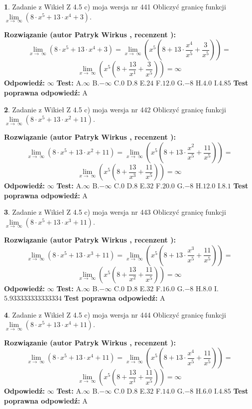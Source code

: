 \documentclass[12pt, a4paper]{article}
\theoremstyle{definition} %
\newtheorem{zad}{}
\newcommand{\zadStart}[1]{\begin{zad}#1\newline}
\newcommand{\zadStop}{\end{zad}}
\newcommand{\rozwStart}[2]{\noindent \textbf{Rozwiązanie (autor #1 , recenzent #2): }\newline}
\newcommand{\rozwStop}{\newline}
\newcommand{\odpStart}{\noindent \textbf{Odpowiedź:}\newline}
\newcommand{\odpStop}{\newline}
\newcommand{\testStart}{\noindent \textbf{Test:}\newline}
\newcommand{\testStop}{\newline}
\newcommand{\kluczStart}{\noindent \textbf{Test poprawna odpowiedź:}\newline}
\newcommand{\kluczStop}{\newline}
\begin{document}
\zadStart{Zadanie z Wikieł Z 4.5 c) moja wersja nr 441}
Obliczyć granicę funkcji  $\lim\limits_{x\to\ \infty}(8 \cdot x^{5}+13 \cdot x^{4}+3)$.
\zadStop
\rozwStart{Patryk Wirkus}{}
$$\lim\limits_{x\to\ \infty}(8 \cdot x^{5}+13 \cdot x^{4}+3) = \lim\limits_{x\to\ \infty}(x^{5}(8 +13 \cdot \frac{x^{4}}{x^{5}}+\frac{3}{x^{5}})) =$$ $$\lim\limits_{x\to\ \infty}(x^{5}(8 +\frac{13}{x^{1}}+\frac{3}{x^{5}})) =\infty$$
\rozwStop
\odpStart
$\infty$
\odpStop
\testStart
A.$\infty$ B.$-\infty$ C.$0$ D.$8$ E.$24$
F.$12.0$ G.$-8$
H.$4.0$
I.$4.85$
\testStop
\kluczStart
A
\kluczStop



\zadStart{Zadanie z Wikieł Z 4.5 c) moja wersja nr 442}
Obliczyć granicę funkcji  $\lim\limits_{x\to\ \infty}(8 \cdot x^{5}+13 \cdot x^{2}+11)$.
\zadStop
\rozwStart{Patryk Wirkus}{}
$$\lim\limits_{x\to\ \infty}(8 \cdot x^{5}+13 \cdot x^{2}+11) = \lim\limits_{x\to\ \infty}(x^{5}(8 +13 \cdot \frac{x^{2}}{x^{5}}+\frac{11}{x^{5}})) =$$ $$\lim\limits_{x\to\ \infty}(x^{5}(8 +\frac{13}{x^{3}}+\frac{11}{x^{5}})) =\infty$$
\rozwStop
\odpStart
$\infty$
\odpStop
\testStart
A.$\infty$ B.$-\infty$ C.$0$ D.$8$ E.$32$
F.$20.0$ G.$-8$
H.$12.0$
I.$8.1$
\testStop
\kluczStart
A
\kluczStop



\zadStart{Zadanie z Wikieł Z 4.5 c) moja wersja nr 443}
Obliczyć granicę funkcji  $\lim\limits_{x\to\ \infty}(8 \cdot x^{5}+13 \cdot x^{3}+11)$.
\zadStop
\rozwStart{Patryk Wirkus}{}
$$\lim\limits_{x\to\ \infty}(8 \cdot x^{5}+13 \cdot x^{3}+11) = \lim\limits_{x\to\ \infty}(x^{5}(8 +13 \cdot \frac{x^{3}}{x^{5}}+\frac{11}{x^{5}})) =$$ $$\lim\limits_{x\to\ \infty}(x^{5}(8 +\frac{13}{x^{2}}+\frac{11}{x^{5}})) =\infty$$
\rozwStop
\odpStart
$\infty$
\odpStop
\testStart
A.$\infty$ B.$-\infty$ C.$0$ D.$8$ E.$32$
F.$16.0$ G.$-8$
H.$8.0$
I.$5.933333333333334$
\testStop
\kluczStart
A
\kluczStop



\zadStart{Zadanie z Wikieł Z 4.5 c) moja wersja nr 444}
Obliczyć granicę funkcji  $\lim\limits_{x\to\ \infty}(8 \cdot x^{5}+13 \cdot x^{4}+11)$.
\zadStop
\rozwStart{Patryk Wirkus}{}
$$\lim\limits_{x\to\ \infty}(8 \cdot x^{5}+13 \cdot x^{4}+11) = \lim\limits_{x\to\ \infty}(x^{5}(8 +13 \cdot \frac{x^{4}}{x^{5}}+\frac{11}{x^{5}})) =$$ $$\lim\limits_{x\to\ \infty}(x^{5}(8 +\frac{13}{x^{1}}+\frac{11}{x^{5}})) =\infty$$
\rozwStop
\odpStart
$\infty$
\odpStop
\testStart
A.$\infty$ B.$-\infty$ C.$0$ D.$8$ E.$32$
F.$14.0$ G.$-8$
H.$6.0$
I.$4.85$
\testStop
\kluczStart
A
\kluczStop
\end{document}
